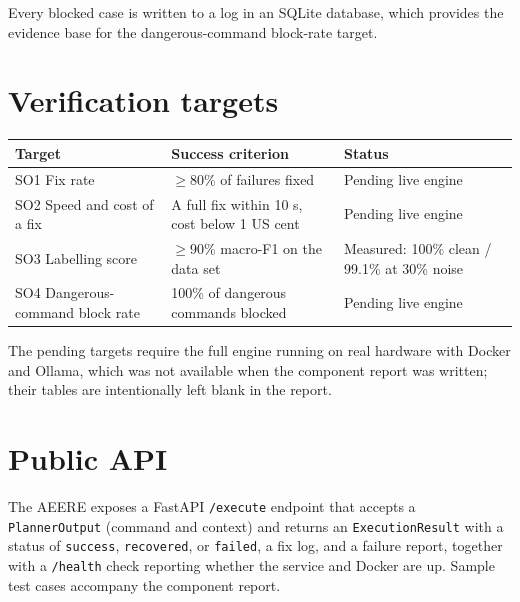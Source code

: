 Every blocked case is written to a log in an SQLite database, which provides
the evidence base for the dangerous-command block-rate target.

\section{Verification targets}

\begin{center}
\begin{tabular}{@{}p{}p{}p{}@{}}
  \toprule
  \textbf{Target} & \textbf{Success criterion} & \textbf{Status}\\
  \midrule
  SO1 Fix rate & \(\geq\)80\% of failures fixed & Pending live engine\\
  SO2 Speed and cost of a fix & A full fix within 10 s, cost below 1 US cent & Pending live engine\\
  SO3 Labelling score & \(\geq\)90\% macro-F1 on the data set & Measured: 100\% clean / 99.1\% at 30\% noise\\
  SO4 Dangerous-command block rate & 100\% of dangerous commands blocked & Pending live engine\\
  \bottomrule
\end{tabular}
\end{center}

The pending targets require the full engine running on real hardware with
Docker and Ollama, which was not available when the component report was
written; their tables are intentionally left blank in the report.

\section{Public API}

The AEERE exposes a FastAPI \texttt{/execute} endpoint that accepts a
\texttt{PlannerOutput} (command and context) and returns an
\texttt{ExecutionResult} with a status of \texttt{success}, \texttt{recovered},
or \texttt{failed}, a fix log, and a failure report, together with a
\texttt{/health} check reporting whether the service and Docker are up. Sample
test cases accompany the component report.